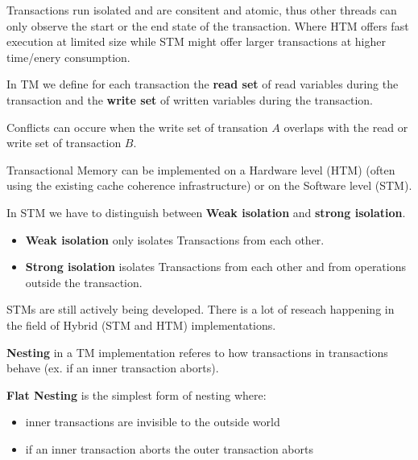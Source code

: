 \begin{lemma}
    Transactions run isolated and are consitent and atomic, thus other threads can only observe the start or the end state of the transaction. Where HTM offers fast execution at limited size while STM might offer larger transactions at higher time/enery consumption.
\end{lemma}

\begin{definition}
    In TM we define for each transaction the \textbf{read set} of read variables during the transaction and the \textbf{write set} of written variables during the transaction.
\end{definition}

\begin{remark}
    Conflicts can occure when the write set of transation $A$ overlaps with the read or write set of transaction $B$.
\end{remark}

\begin{remark}
    Transactional Memory can be implemented on a Hardware level (HTM) (often using the existing cache coherence infrastructure) or on the Software level (STM).
\end{remark}

\begin{definition}
    In STM we have to distinguish between \textbf{Weak isolation} and \textbf{strong isolation}.
    \begin{itemize}
        \item \textbf{Weak isolation} only isolates Transactions from each other.
        \item \textbf{Strong isolation} isolates Transactions from each other and from operations outside the transaction.
    \end{itemize}
\end{definition}

\begin{remark}
    STMs are still actively being developed. There is a lot of reseach happening in the field of Hybrid (STM and HTM) implementations.
\end{remark}

\begin{definition}
    \textbf{Nesting} in a TM implementation referes to how transactions in transactions behave (ex. if an inner transaction aborts).
\end{definition}

\begin{definition}
    \textbf{Flat Nesting} is the simplest form of nesting where:
    \begin{itemize}
        \item inner transactions are invisible to the outside world
        \item if an inner transaction aborts the outer transaction aborts
    \end{itemize}
\end{definition}

